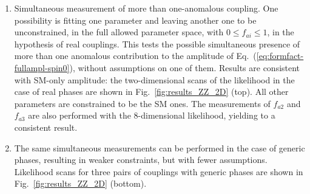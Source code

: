 \begin{enumerate}
  \item Simultaneous measurement of more than one-anomalous coupling.
    One possibility is fitting one parameter and leaving another one
    to be unconstrained, in the full allowed parameter space, with
    $0\le f_{ai}\le 1$, in the hypothesis of real couplings. This
    tests the possible simultaneous presence of more than one
    anomalous contribution to the amplitude of
    Eq.~(\ref{eq:formfact-fullampl-spin0}), without assumptions on one
    of them. Results are consistent with SM-only amplitude: the
    two-dimensional scans of the likelihood in the case of real phases
    are shown in Fig.~\ref{fig:results_ZZ_2D} (top). All other
    parameters are constrained to be the SM ones. The measurements of
    $f_{a2}$ and $f_{a3}$ are also performed with the 8-dimensional
    likelihood, yielding to a consistent result.
\item The same simultaneous measurements can be performed in the case
  of generic phases, resulting in weaker constraints, but with fewer
  assumptions. Likelihood scans for three pairs of couplings with
  generic phases are shown in Fig.~\ref{fig:results_ZZ_2D} (bottom).


\end{enumerate}
